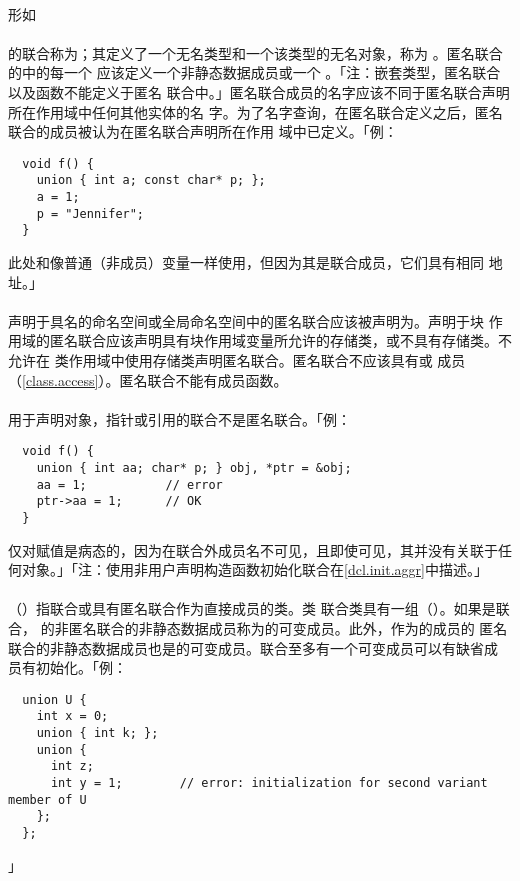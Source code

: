\paragraph{}
形如                                                                          \\
\mbox{}              \\
的联合称为；其定义了一个无名类型和一个该类型的无名对象，称为
。匿名联合的中的每一个
应该定义一个非静态数据成员或一个
。「注：嵌套类型，匿名联合以及函数不能定义于匿名
联合中。」匿名联合成员的名字应该不同于匿名联合声明所在作用域中任何其他实体的名
字。为了名字查询，在匿名联合定义之后，匿名联合的成员被认为在匿名联合声明所在作用
域中已定义。「例：
\begin{lstlisting}
  void f() {
    union { int a; const char* p; };
    a = 1;
    p = "Jennifer";
  }
\end{lstlisting}
此处和像普通（非成员）变量一样使用，但因为其是联合成员，它们具有相同
地址。」

\paragraph{}
声明于具名的命名空间或全局命名空间中的匿名联合应该被声明为。声明于块
作用域的匿名联合应该声明具有块作用域变量所允许的存储类，或不具有存储类。不允许在
类作用域中使用存储类声明匿名联合。匿名联合不应该具有或
成员（\ref{class.access}）。匿名联合不能有成员函数。

\paragraph{}
用于声明对象，指针或引用的联合不是匿名联合。「例：
\begin{lstlisting}
  void f() {
    union { int aa; char* p; } obj, *ptr = &obj;
    aa = 1;           // error
    ptr->aa = 1;      // OK
  }
\end{lstlisting}
仅对赋值是病态的，因为在联合外成员名不可见，且即使可见，其并没有关联于任
何对象。」「注：使用非用户声明构造函数初始化联合在\ref{dcl.init.aggr}中描述。」

\paragraph{}
（）指联合或具有匿名联合作为直接成员的类。类
联合类具有一组（）。如果是联合，
的非匿名联合的非静态数据成员称为的可变成员。此外，作为的成员的
匿名联合的非静态数据成员也是的可变成员。联合至多有一个可变成员可以有缺省成
员有初始化。「例：
\begin{lstlisting}
  union U {
    int x = 0;
    union { int k; };
    union {
      int z;
      int y = 1;        // error: initialization for second variant member of U
    };
  };
\end{lstlisting}」

